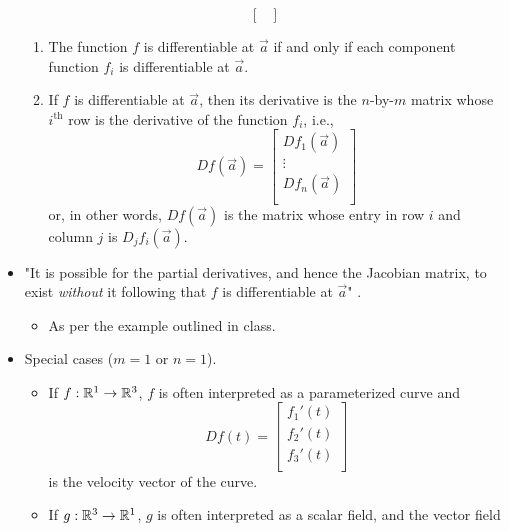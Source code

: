\documentclass[../notes.tex]{subfiles}
\begin{document}
\begin{itemize}
\begin{equation*}
\begin{bmatrix}
        \end{bmatrix}
    \end{equation*}
    \begin{enumerate}[label={(\alph*)}]
        \item The function $f$ is differentiable at $\vec{a}$ if and only if each component function $f_i$ is differentiable at $\vec{a}$.
        \item If $f$ is differentiable at $\vec{a}$, then its derivative is the $n$-by-$m$ matrix whose $i^\text{th}$ row is the derivative of the function $f_i$, i.e.,
        \begin{equation*}
            Df(\vec{a}) =
            \begin{bmatrix}
                Df_1(\vec{a})\\
                \vdots\\
                Df_n(\vec{a})\\
            \end{bmatrix}
        \end{equation*}
        or, in other words, $Df(\vec{a})$ is the matrix whose entry in row $i$ and column $j$ is $D_jf_i(\vec{a})$.
    \end{enumerate}
    \item "It is possible for the partial derivatives, and hence the Jacobian matrix, to exist \emph{without} it following that $f$ is differentiable at $\vec{a}$" \parencite[47]{bib:Munkres}.
    \begin{itemize}
        \item As per the example outlined in class.
    \end{itemize}
    \item Special cases ($m=1$ or $n=1$).
    \begin{itemize}
        \item If $f:\mathbb{R}^1\to\mathbb{R}^3$, $f$ is often interpreted as a parameterized curve and
        \begin{equation*}
            \renewcommand{\arraystretch}{1.2}
            Df(t) =
            \begin{bmatrix}
                f_1'(t)\\
                f_2'(t)\\
                f_3'(t)\\
            \end{bmatrix}
        \end{equation*}
        is the velocity vector of the curve.
        \item If $g:\mathbb{R}^3\to\mathbb{R}^1$, $g$ is often interpreted as a scalar field, and the vector field

\end{itemize}
\end{itemize}
\end{document}
